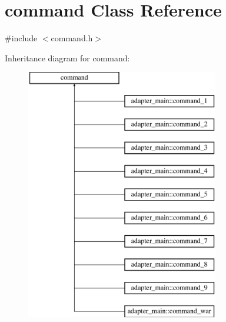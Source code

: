 \hypertarget{classcommand}{}\section{command Class Reference}
\label{classcommand}


{\ttfamily \#include $<$command.\+h$>$}

Inheritance diagram for command\+:\begin{figure}[H]
\begin{center}
\leavevmode
\includegraphics[height=11.000000cm]{classcommand}
\end{center}
\end{figure}

